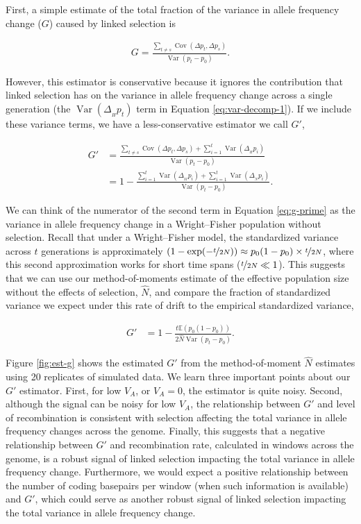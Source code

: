 \documentclass[11pt]{article}
\newcommand{\E}{\mathbb{E}}
\DeclareMathOperator{\var}{Var}
\DeclareMathOperator{\cov}{Cov}
\begin{document}
First, a simple estimate of the total fraction of the variance in allele
frequency change ($G$) caused by linked selection is

\begin{align}
  G = \frac{\sum_{t \ne s}\cov(\Delta p_t, \Delta p_s)}{\var(p_t - p_0)}.
\end{align}

However, this estimator is conservative because it ignores the contribution
that linked selection has on the variance in allele frequency change across a
single generation (the $\var(\Delta_{_H} p_t)$ term in Equation
\ref{eq:var-decomp-1}). If we include these variance terms, we have a
less-conservative estimator we call $G'$,

\begin{align}
  G' &= \frac{\sum_{t \ne s}\cov(\Delta p_t, \Delta p_s) + \sum_{i=1}^t \var(\Delta_{_H} p_i)}{\var(p_t - p_0)} \nonumber \\
     &= 1 - \frac{\sum_{i=1}^t \var(\Delta_{_M} p_i) + \sum_{i=1}^t \var( \Delta_{_N} p_i)}{\var(p_t - p_0)}.
  \label{eq:g-prime}
\end{align}

We can think of the numerator of the second term in Equation \eqref{eq:g-prime}
as the variance in allele frequency change in a Wright--Fisher population
without selection.  Recall that under a Wright--Fisher model, the standardized
variance across $t$ generations is approximately $(1 - \exp(-\nicefrac{t}{2N}))
\approx p_0(1-p_0) \times \nicefrac{t}{2N}$, where this second approximation
works for short time spans ($\nicefrac{t}{2N} \ll 1$).  This suggests that we
can use our method-of-moments estimate of the effective population size without
the effects of selection, $\widehat{N}$, and compare the fraction of
standardized variance we expect under this rate of drift to the empirical
standardized variance,

\begin{align}
  G' &= 1 - \frac{t \E(p_{0}(1-p_{0})) }{2 \widehat{N} \var(p_{t} - p_{0}) }.
\end{align}

Figure \ref{fig:est-g} shows the estimated $G'$ from the method-of-moment
$\widehat{N}$ estimates using 20 replicates of simulated data. We learn
three important points about our $G'$ estimator. First, for low $V_A$, or $V_A
= 0$, the estimator is quite noisy. Second, although the signal can be noisy
for low $V_A$, the relationship between $G'$ and level of recombination is
consistent with selection affecting the total variance in allele frequency
changes across the genome. Finally, this suggests that a negative relationship
between $G'$ and recombination rate, calculated in windows across the genome,
is a robust signal of linked selection impacting the total variance in allele
frequency change. Furthermore, we would expect a positive relationship between
the number of coding basepairs per window (when such information is available)
and $G'$, which could serve as another robust signal of linked selection
impacting the total variance in allele frequency change.
\end{document}
